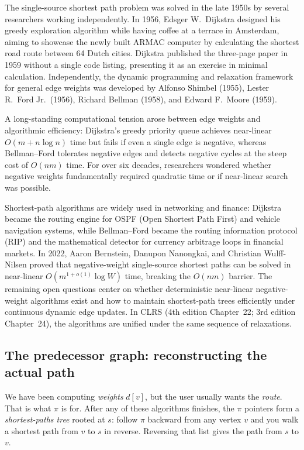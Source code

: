 \begin{historybox}
The single-source shortest path problem was solved in the late 1950s by several researchers working independently. In 1956, Edsger W.\ Dijkstra designed his greedy exploration algorithm while having coffee at a terrace in Amsterdam, aiming to showcase the newly built ARMAC computer by calculating the shortest road route between 64 Dutch cities. Dijkstra published the three-page paper in 1959 without a single code listing, presenting it as an exercise in minimal calculation. Independently, the dynamic programming and relaxation framework for general edge weights was developed by Alfonso Shimbel (1955), Lester R.\ Ford Jr.\ (1956), Richard Bellman (1958), and Edward F.\ Moore (1959).

A long-standing computational tension arose between edge weights and algorithmic efficiency: Dijkstra's greedy priority queue achieves near-linear $O(m + n \log n)$ time but fails if even a single edge is negative, whereas Bellman--Ford tolerates negative edges and detects negative cycles at the steep cost of $O(n m)$ time. For over six decades, researchers wondered whether negative weights fundamentally required quadratic time or if near-linear search was possible.

Shortest-path algorithms are widely used in networking and finance: Dijkstra became the routing engine for OSPF (Open Shortest Path First) and vehicle navigation systems, while Bellman--Ford became the routing information protocol (RIP) and the mathematical detector for currency arbitrage loops in financial markets. In 2022, Aaron Bernstein, Danupon Nanongkai, and Christian Wulff-Nilsen proved that negative-weight single-source shortest paths can be solved in near-linear $O(m^{1+o(1)} \log W)$ time, breaking the $O(nm)$ barrier. The remaining open questions center on whether deterministic near-linear negative-weight algorithms exist and how to maintain shortest-path trees efficiently under continuous dynamic edge updates. In CLRS (4th edition Chapter~22; 3rd edition Chapter~24), the algorithms are unified under the same sequence of relaxations.
\end{historybox}

\subsection{The predecessor graph: reconstructing the actual path}

We have been computing \emph{weights} $d[v]$, but the user usually wants the
\emph{route}. That is what $\pi$ is for. After any of these algorithms finishes,
the $\pi$ pointers form a \emph{shortest-paths tree} rooted at $s$: follow $\pi$
backward from any vertex $v$ and you walk a shortest path from $v$ to $s$ in
reverse. Reversing that list gives the path from $s$ to $v$.

